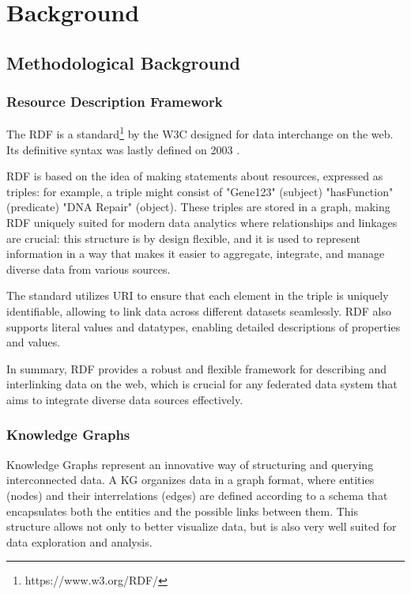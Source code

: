 
\chapter{Background}
\label{chp:background}

\section{Methodological Background}
\subsection{Resource Description Framework}
The \ac{RDF} is a standard\footnote{https://www.w3.org/RDF/} by the \ac{W3C} designed for data interchange on the web. Its definitive syntax was lastly defined on 2003 \cite{beckett2004rdf}.

\ac{RDF} is based on the idea of making statements about resources, expressed as triples: for example, a triple might consist of "Gene123" (subject) "hasFunction" (predicate) "DNA Repair" (object). These triples are stored in a graph, making \ac{RDF} uniquely suited for modern data analytics where relationships and linkages are crucial: this structure is by design flexible, and it is used to represent information in a way that makes it easier to aggregate, integrate, and manage diverse data from various sources.

The standard utilizes \ac{URI} to ensure that each element in the triple is uniquely identifiable, allowing to link data across different datasets seamlessly. \ac{RDF} also supports literal values and datatypes, enabling detailed descriptions of properties and values.

In summary, \ac{RDF} provides a robust and flexible framework for describing and interlinking data on the web, which is crucial for any federated data system that aims to integrate diverse data sources effectively.

\subsection{Knowledge Graphs}
Knowledge Graphs represent an innovative way of structuring and querying interconnected data. A \ac{KG} organizes data in a graph format, where entities (nodes) and their interrelations (edges) are defined according to a schema that encapsulates both the entities and the possible links between them. This structure allows not only to better visualize data, but is also very well suited for data exploration and analysis.

